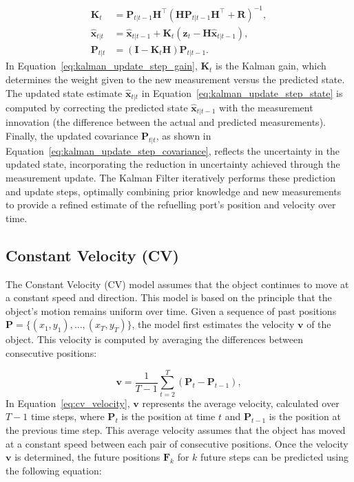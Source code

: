 \documentclass[12pt,oneside]{book} %
\begin{document}
\begin{align}
    \mathbf{K}_t           & = \mathbf{P}_{t|t-1} \mathbf{H}^\top \left(\mathbf{H} \mathbf{P}_{t|t-1} \mathbf{H}^\top + \mathbf{R}\right)^{-1}, \label{eq:kalman_update_step_gain} \\
    \hat{\mathbf{x}}_{t|t} & = \hat{\mathbf{x}}_{t|t-1} + \mathbf{K}_t \left(\mathbf{z}_t - \mathbf{H} \hat{\mathbf{x}}_{t|t-1}\right), \label{eq:kalman_update_step_state}        \\
    \mathbf{P}_{t|t}       & = \left(\mathbf{I} - \mathbf{K}_t \mathbf{H}\right) \mathbf{P}_{t|t-1}. \label{eq:kalman_update_step_covariance}
\end{align}
In Equation~\eqref{eq:kalman_update_step_gain}, $\mathbf{K}_t$ is the Kalman gain, which determines the weight given to the new measurement versus the predicted state. The updated state estimate $\hat{\mathbf{x}}_{t|t}$ in Equation~\eqref{eq:kalman_update_step_state} is computed by correcting the predicted state $\hat{\mathbf{x}}_{t|t-1}$ with the measurement innovation (the difference between the actual and predicted measurements). Finally, the updated covariance $\mathbf{P}_{t|t}$, as shown in Equation~\eqref{eq:kalman_update_step_covariance}, reflects the uncertainty in the updated state, incorporating the reduction in uncertainty achieved through the measurement update.
The Kalman Filter iteratively performs these prediction and update steps,
optimally combining prior knowledge and new measurements to provide a refined
estimate of the refuelling port's position and velocity over time.

\subsection*{Constant Velocity (CV)}
\noindent The Constant Velocity (CV) model assumes that the object continues to move at a constant speed and direction. This model is based on the principle that the object's motion remains uniform over time. Given a sequence of past positions $\mathbf{P} = \{(x_1, y_1), \dots, (x_T, y_T)\}$, the model first estimates the velocity $\mathbf{v}$ of the object. This velocity is computed by averaging the differences between consecutive positions:

\begin{equation}
    \mathbf{v} = \frac{1}{T-1} \sum_{t=2}^{T} \left(\mathbf{P}_t - \mathbf{P}_{t-1}\right), \label{eq:cv_velocity}
\end{equation}
In Equation~\eqref{eq:cv_velocity}, $\mathbf{v}$ represents the average velocity, calculated over $T-1$ time steps, where $\mathbf{P}_t$ is the position at time $t$ and $\mathbf{P}_{t-1}$ is the position at the previous time step. This average velocity assumes that the object has moved at a constant speed between each pair of consecutive positions.
Once the velocity $\mathbf{v}$ is determined, the future positions
$\mathbf{F}_{k}$ for $k$ future steps can be predicted using the following
equation:
\end{document}
